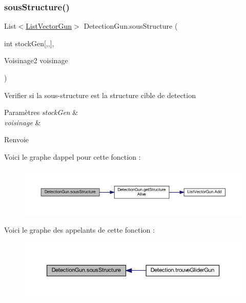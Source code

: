 \subsubsection{\texorpdfstring{sous\+Structure()}{sousStructure()}}
{\footnotesize\ttfamily List$<$\mbox{\hyperlink{class_list_vector_gun}{List\+Vector\+Gun}}$>$ Detection\+Gun.\+sous\+Structure (\begin{DoxyParamCaption}\item[{int}]{stock\+Gen\mbox{[},,\mbox{]},  }\item[{Voisinage2}]{voisinage }\end{DoxyParamCaption})\hspace{0.3cm}{\ttfamily [inline]}}



Verifier si la sous-\/structure est la structure cible de detection 


\begin{DoxyParams}{Paramètres}
{\em stock\+Gen} & \\
\hline
{\em voisinage} & \\
\hline
\end{DoxyParams}
\begin{DoxyReturn}{Renvoie}

\end{DoxyReturn}
Voici le graphe d\textquotesingle{}appel pour cette fonction \+:\nopagebreak
\begin{figure}[H]
\begin{center}
\leavevmode
\includegraphics[width=350pt]{class_detection_gun_af804b47fcbcc2c89bbe17b47eb8f7c47_cgraph}
\end{center}
\end{figure}
Voici le graphe des appelants de cette fonction \+:\nopagebreak
\begin{figure}[H]
\begin{center}
\leavevmode
\includegraphics[width=350pt]{class_detection_gun_af804b47fcbcc2c89bbe17b47eb8f7c47_icgraph}
\end{center}
\end{figure}
\mbox{\label{class_detection_gun_aaafe20e9ecbfe9e95e2f36ac49701d3d}} 
